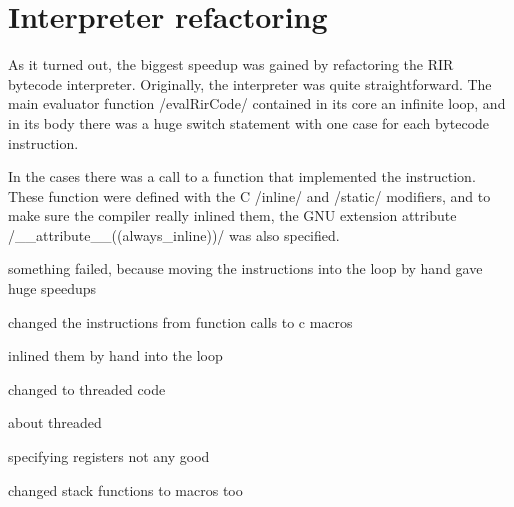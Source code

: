 
\section{Interpreter refactoring}

As it turned out, the biggest speedup was gained by refactoring the RIR bytecode interpreter. Originally, the interpreter was quite straightforward. The main evaluator function \cinline/evalRirCode/ contained in its core an infinite loop, and in its body there was a huge switch statement with one case for each bytecode instruction.

In the cases there was a call to a function that implemented the instruction. These function were defined with the C \cinline/inline/ and \cinline/static/ modifiers, and to make sure the compiler really inlined them, the GNU extension attribute \cinline/__attribute__((always_inline))/ was also specified.

something failed, because moving the instructions into the loop by hand gave huge speedups

changed the instructions from function calls to c macros

inlined them by hand into the loop

changed to threaded code

about threaded

specifying registers not any good

changed stack functions to macros too
